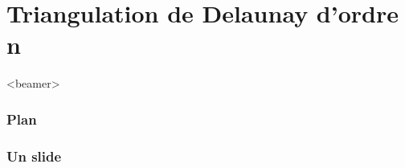 \section{Triangulation de Delaunay d'ordre n}

  \begin{frame}<beamer>
    \frametitle{Plan}
    \tableofcontents[currentsection]
  \end{frame}

\begin{frame}
  	\frametitle{Un slide}


\end{frame}
